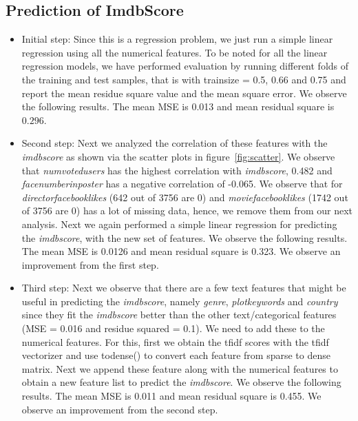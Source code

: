 \documentclass{article}%
\begin{document}
\subsection{Prediction of ImdbScore}
\begin{itemize}
\item Initial step: Since this is a regression problem, we just run a simple linear regression using all the numerical features. To be noted for all the linear regression models, we have performed evaluation by running different folds of the training and test samples, that is with trainsize = 0.5, 0.66 and 0.75 and report the mean residue square value and the mean square error. We observe the following results. The mean MSE is 0.013 and mean residual square is $0.296$.
\end{itemize}

\begin{itemize}
\item Second step: Next we analyzed the correlation of these features with the \textit{imdbscore} as shown via the scatter plots in figure~\ref{fig:scatter}. We observe that \textit{numvotedusers} has the highest correlation with \textit{imdbscore}, 0.482 and \textit{facenumberinposter} has a negative correlation of -0.065. We observe that for \textit{directorfacebooklikes} (642 out of 3756 are 0) and \textit{moviefacebooklikes} (1742 out of 3756 are 0) has a lot of missing data, hence, we remove them from our next analysis. Next we again performed a simple linear regression for predicting the \textit{imdbscore}, with the new set of features. We observe the following results. The mean MSE is 0.0126 and mean residual square is 0.323. We observe an improvement from the first step.
\end{itemize}

\begin{itemize}
\item Third step: Next we observe that there are a few text features that might be useful in predicting the \textit{imdbscore}, namely \textit{genre}, \textit{plotkeywords} and \textit{country} since they fit the \textit{imdbscore} better than the other text/categorical features (MSE = 0.016 and residue squared = 0.1). We need to add these to the numerical features. For this, first we obtain the tfidf scores with the tfidf vectorizer and use todense() to convert each feature from sparse to dense matrix. Next we append these feature along with the numerical features to obtain a new feature list to predict the \textit{imdbscore}. We observe the following results. The mean MSE is 0.011 and mean residual square is 0.455. We observe an improvement from the second step.
\end{itemize}
\end{document}
